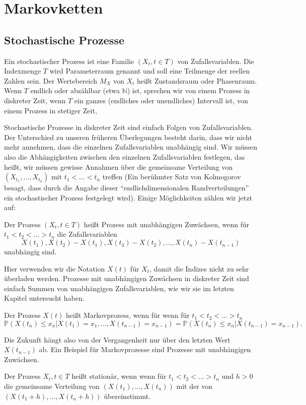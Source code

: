 \chapter{Markovketten}



\section{Stochastische Prozesse}
\begin{definition}Ein stochastischer Prozess ist 
eine Familie $(X_t,t\in T)$ von Zufallsvariablen. Die Indexmenge $T$
wird Parameterraum genannt und soll eine Teilmenge der reellen Zahlen sein.
Der Wertebereich $M_X$ von $X_t$ heißt Zustandsraum oder Phasenraum.
Wenn $T$ endlich oder abzählbar (etwa $\mathbb N$) 
ist, sprechen wir von einem Prozess in
diskreter Zeit, wenn $T$ ein ganzes (endliches oder unendliches) Intervall
ist, von einem Prozess in stetiger Zeit, 
\end{definition}
Stochastische Prozesse in diskreter Zeit sind einfach Folgen von
 Zufallsvariablen. Der Unterschied zu unseren früheren Überlegungen besteht 
darin, dass wir nicht mehr annehmen, dass die einzelnen Zufallsvariablen
unabhängig sind. Wir müssen also die Abhängigkeiten zwischen den einzelnen
Zufallsvariablen festlegen, das heißt, wir müssen gewisse Annahmen über
die gemeinsame Verteilung von $(X_{t_1},\dots,X_{t_n})$ mit 
$t_1<\dots<t_n$ treffen (Ein berühmter Satz von Kolmogorov besagt, dass
durch die Angabe dieser ``endlichdimensionalen Randverteilungen'' ein
stochastischer Prozess festgelegt wird). 
Einige Möglichkeiten zählen wir jetzt auf:
\begin{definition}
Der Prozess $(X_t, t\in T)$ heißt Prozess mit unabhängigen Zuwächsen,
wenn für $t_1<t_2<\dots>t_n$ die Zufallsvariablen
\[X(t_1), X(t_2)-X(t_1), X(t_3)-X(t_2),\dots, X(t_n)-X(t_{n-1})\]
unabhängig sind.
\end{definition}
Hier verwenden wir die Notation $X(t)$ für $X_t$, damit die Indizes nicht
zu sehr überladen werden. 
Prozesse mit unabhängigen Zuwächsen in diskreter Zeit sind einfach
Summen von unabhängigen Zufallsvariablen, wie wir sie im letzten Kapitel
untersucht haben.
\begin{definition}
Der Prozess $X(t)$ heißt Markovprozess, wenn für
wenn für $t_1<t_2<\dots>t_n$ 
\[\mathbb P(X(t_n)\le x_n|X(t_1)=x_1,\dots,X(t_{n-1})=x_{n-1})=
\mathbb P(X(t_n)\le x_n|X(t_{n-1})=x_{n-1}).\]
\end{definition}
Die Zukunft hängt also von der Vergangenheit nur über den letzten Wert
$X(t_{n-1})$ ab. Ein Beispiel für Markovprozesse sind Prozesse mit
unabhängigen Zuwächsen.
\begin{definition}
Der Prozess $X_t,t\in T$ heißt stationär, wenn
wenn für $t_1<t_2<\dots>t_n$ und $h>0$
die gemeinsame Verteilung von $(X(t_1),\dots,X(t_n))$
mit der von $(X(t_1+h),\dots,X(t_n+h))$ übereinstimmt.
\end{definition}
